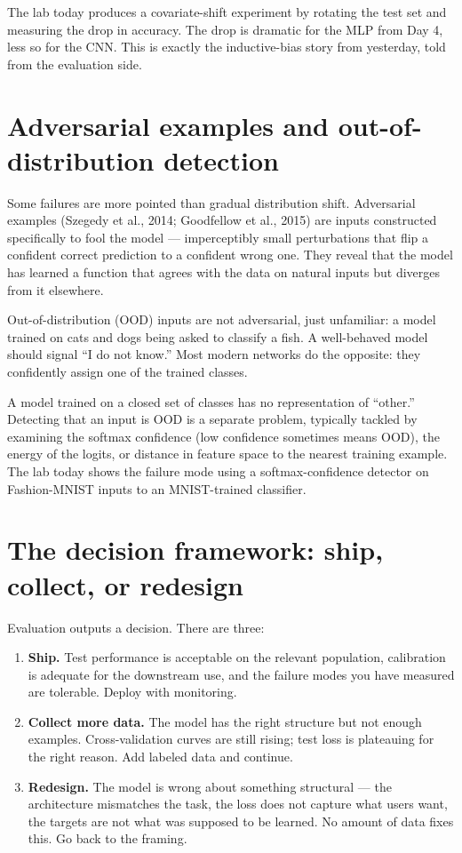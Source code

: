 The lab today produces a covariate-shift experiment by rotating the test set and measuring the drop in accuracy. The drop is dramatic for the MLP from Day 4, less so for the CNN. This is exactly the inductive-bias story from yesterday, told from the evaluation side.

\section{Adversarial examples and out-of-distribution detection}

Some failures are more pointed than gradual distribution shift. Adversarial examples (Szegedy et al., 2014; Goodfellow et al., 2015) are inputs constructed specifically to fool the model --- imperceptibly small perturbations that flip a confident correct prediction to a confident wrong one. They reveal that the model has learned a function that agrees with the data on natural inputs but diverges from it elsewhere.

Out-of-distribution (OOD) inputs are not adversarial, just unfamiliar: a model trained on cats and dogs being asked to classify a fish. A well-behaved model should signal ``I do not know.'' Most modern networks do the opposite: they confidently assign one of the trained classes.

\begin{intuition}
A model trained on a closed set of classes has no representation of ``other.'' Detecting that an input is OOD is a separate problem, typically tackled by examining the softmax confidence (low confidence sometimes means OOD), the energy of the logits, or distance in feature space to the nearest training example. The lab today shows the failure mode using a softmax-confidence detector on Fashion-MNIST inputs to an MNIST-trained classifier.
\end{intuition}

\section{The decision framework: ship, collect, or redesign}

Evaluation outputs a decision. There are three:

\begin{enumerate}
  \item \textbf{Ship.} Test performance is acceptable on the relevant population, calibration is adequate for the downstream use, and the failure modes you have measured are tolerable. Deploy with monitoring.
  \item \textbf{Collect more data.} The model has the right structure but not enough examples. Cross-validation curves are still rising; test loss is plateauing for the right reason. Add labeled data and continue.
  \item \textbf{Redesign.} The model is wrong about something structural --- the architecture mismatches the task, the loss does not capture what users want, the targets are not what was supposed to be learned. No amount of data fixes this. Go back to the framing.
\end{enumerate}

